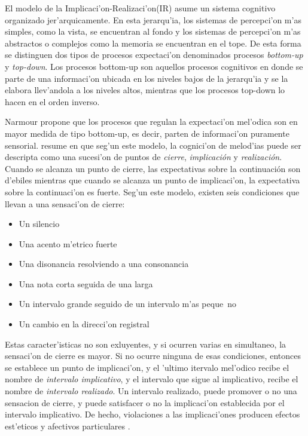 \begin{imagen}
    \width{11cm}
\end{imagen}


El modelo de la Implicaci'on-Realizaci'on(IR) asume un sistema cognitivo organizado jer'arquicamente. En esta jerarqu'ia, los sistemas 
de percepci'on m'as simples, como la vista, se encuentran al fondo y los sistemas de percepci'on m'as abstractos o complejos como la memoria
se encuentran en el tope. De esta forma se distinguen dos tipos de procesos expectaci'on denominados procesos \emph{bottom-up} 
y \emph{top-down}. Los procesos bottom-up son aquellos procesos cognitivos en donde se parte de una informaci'on ubicada en los niveles bajos de la jerarqu'ia y se la 
elabora llev'andola a los niveles altos, mientras que los procesos top-down lo hacen en el orden inverso. 

Narmour propone que los procesos que regulan la expectaci'on mel'odica son en mayor medida de tipo bottom-up, es decir, parten de informaci'on puramente sensorial. 
\cite{Krumhansl95} resume en  que seg'un este modelo, la cognici'on de melod'ias puede ser descripta como una sucesi'on de puntos 
de \emph{cierre}, \emph{implicaci\'on} y \emph{realizaci\'on}. Cuando se alcanza un punto de cierre, las expectativas sobre la continuaci\'on 
son d'ebiles mientras que cuando se alcanza un punto de implicaci'on, la expectativa sobre la continuaci'on es fuerte. Seg'un este modelo,
existen seis condiciones que llevan a una sensaci'on de cierre:
\begin{itemize}
 \item Un silencio
 \item Una acento m'etrico fuerte
 \item Una disonancia resolviendo a una consonancia
 \item Una nota corta seguida de una larga
 \item Un intervalo grande seguido de un intervalo m'as peque~no
 \item Un cambio en la direcci'on registral
\end{itemize}

Estas caracter'isticas no son exluyentes, y si ocurren varias en simultaneo, la sensaci'on de cierre es mayor. 
Si no ocurre ninguna de esas condiciones, entonces se establece un punto de implicaci'on, y el 'ultimo itervalo mel'odico recibe el nombre
de \emph{intervalo implicativo}, y el intervalo que sigue al implicativo, recibe el nombre de \emph{intervalo realizado}. 
Un intervalo realizado, puede promover o no una sensacion de cierre, y puede satisfacer o no la implicaci'on establecida por el intervalo 
implicativo. De hecho, violaciones a las implicaci'ones producen efectos est'eticos y afectivos particulares \citep{Narmour91}.
 
